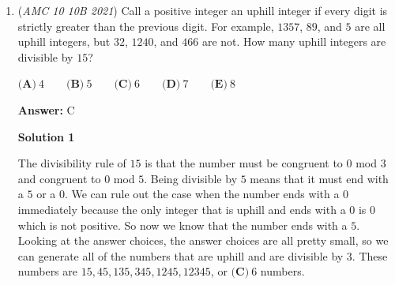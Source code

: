\begin{enumerate}
 



\textbf{Solution 8 (very intuitive & efficient)}

Squaring $x+\frac{1}{x}=\sqrt{5}$ yields $x^2+2+\frac{1}{x^2}=5$. We subtract $2$ from both sides, yielding $x^2+\frac{1}{x^2}=3$, and, squaring again, we end up with $x^4+2+\frac{1}{x^4}=9$. Subtracting $2$ from both sides again, we end up with $x^4+\frac{1}{x^4}=7$. Observe that $7$ is the coefficient of the $x^7$ term in our second equation, $x^{11}-7x^{7}+x^3$. We can now substitute $x^4+\frac{1}{x^4}$ into the second equation to result in $x^{11}-\left(x^4+\frac{1}{x^4}\right)x^{7}+x^3$. Multiplying the middle term out yields $x^{11}-x^{11}-x^{3}+x^{3}$, and all of the terms cancel out. Therefore, the answer is $\boxed{(B)~0}.$ ~rxm0203

 Note: the problem where this is linked is covered 0:20-1:30

 \textit{ ~Education, the Study of Everything }

 Not the most efficient method, but gets the job done.

 


	\item (\textit{AMC 10 10B 2021}) Call a positive integer an uphill integer if every digit is strictly greater than the previous digit. For example, $1357$, $89$, and $5$ are all uphill integers, but $32$, $1240$, and $466$ are not. How many uphill integers are divisible by $15$?


 $\textbf{(A)} ~4 \qquad\textbf{(B)} ~5 \qquad\textbf{(C)} ~6 \qquad\textbf{(D)} ~7 \qquad\textbf{(E)} ~8$

 \textbf{Answer: }C



\textbf{Solution 1}

The divisibility rule of $15$ is that the number must be congruent to $0$ mod $3$ and congruent to $0$ mod $5$. Being divisible by $5$ means that it must end with a $5$ or a $0$. We can rule out the case when the number ends with a $0$ immediately because the only integer that is uphill and ends with a $0$ is $0$ which is not positive. So now we know that the number ends with a $5$. Looking at the answer choices, the answer choices are all pretty small, so we can generate all of the numbers that are uphill and are divisible by $3$. These numbers are $15, 45, 135, 345, 1245, 12345$, or $\boxed{\textbf{(C)} ~6}$ numbers.

 




\end{enumerate}
